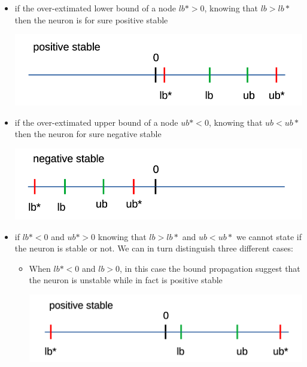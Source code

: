 \begin{itemize}
	\item if the over-extimated lower bound of a node $lb*>0$, knowing that $lb>lb*$ then the neuron is for sure positive stable\\
		\begin{minipage}{\linewidth}
			\centering
			\includegraphics[width=\textwidth]{"Chapter6/img/pos_stable pos_stable"}
		\end{minipage}
	\item if the over-extimated upper bound of a node $ub*<0$, knowing that $ub<ub*$ then the neuron for sure negative stable\\
		\begin{minipage}{\linewidth}
			\centering
			\includegraphics[width=\textwidth]{"Chapter6/img/neg_stable neg_stable"}
		\end{minipage}
	\item if $lb*<0$ and $ub*>0$ knowing that $lb>lb*$ and $ub<ub*$ we cannot state if the neuron is stable or not. We can in turn distinguish three different cases:
	\begin{itemize}
		\item When $lb*<0$ and $lb>0$, in this case the bound propagation suggest that the neuron is unstable while in fact is positive stable\\
			\begin{minipage}{\linewidth}
				\centering
				\includegraphics[width=\textwidth]{"Chapter6/img/unstable pos_stable"}

\end{minipage}
\end{itemize}
\end{itemize}
